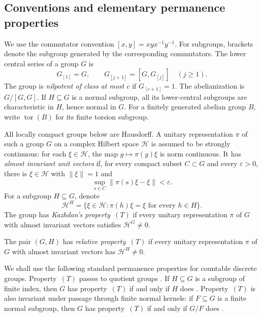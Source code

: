 \documentclass[11pt,a4paper]{article}
\theoremstyle{definition}
\newcommand{\HH}{\mathcal H}
\newcommand{\tor}{\operatorname{tor}}
\newcommand{\rt}{(T)}
\newcommand{\eps}{\varepsilon}
\begin{document}
\subsection{Conventions and elementary permanence properties}

We use the commutator convention \([x,y]=xyx^{-1}y^{-1}\).
For subgroups, brackets denote the subgroup generated by the
corresponding commutators. The lower central series of a group
\(G\) is
\[
 G_{[1]}=G,\qquad G_{[j+1]}=[G,G_{[j]}]\quad(j\ge1).
\]
The group is \emph{nilpotent of class at most \(c\)} if
\(G_{[c+1]}=1\). The abelianization is \(G/[G,G]\).
If \(H\subseteq G\) is a normal subgroup, all its lower-central subgroups are
characteristic in \(H\), hence normal in \(G\).
For a finitely generated abelian group \(B\), write
\(\tor(B)\) for its finite torsion subgroup.

All locally compact groups below are Hausdorff. A unitary
representation \(\pi\) of such a group \(G\) on a complex
Hilbert space \(\HH\) is assumed to be strongly continuous: for each
\(\xi\in\HH\), the map \(g\mapsto\pi(g)\xi\) is norm
continuous. It has \emph{almost invariant unit vectors} if, for
every compact subset \(C\subset G\) and every \(\eps>0\),
there is \(\xi\in\HH\) with \(\|\xi\|=1\) and
\[
 \sup_{s\in C}\|\pi(s)\xi-\xi\|<\eps.
\]
For a subgroup \(H\subseteq G\), denote
\[
 \HH^H=\{\xi\in\HH:\pi(h)\xi=\xi\text{ for every }h\in H\}.
\]
The group has \emph{Kazhdan's property~\(\rt\)} if every unitary representation \(\pi\) of \(G\) with almost invariant vectors satisfies \(\HH^G\neq 0\).

The pair \((G,H)\) has \emph{relative property~\(\rt\)} if every unitary representation \(\pi\) of \(G\) with almost invariant vectors has \(\HH^H\ne0\).

We shall use the following standard permanence properties for
countable discrete groups. Property~\(\rt\) passes to quotient
groups \cite[Theorem~1.3.4]{BHV}. If \(H\subseteq G\) is a
subgroup of finite index, then \(G\) has property~\(\rt\) if
and only if \(H\) does \cite[Theorem~1.7.1]{BHV}. Property~\(\rt\)
is also invariant under passage through finite normal kernels:
if \(F\subseteq G\) is a finite normal subgroup, then \(G\)
has property~\(\rt\) if and only if \(G/F\) does
\cite[Propositions~1.1.5 and~1.7.6]{BHV}.
\end{document}
